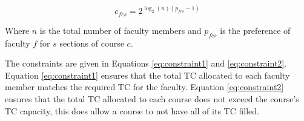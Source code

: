 \documentclass{article}
\begin{document}
    \begin{equation}
        c_{fcs} = 2^{\log_2(n)(p_{fcs}-1)} 
        \label{eq:cost}
    \end{equation}

    Where $n$ is the total number of faculty members and $p_{fcs}$ is the preference of faculty $f$ for $s$ sections of course $c$.

    The constraints are given in Equations \eqref{eq:constraint1} and \eqref{eq:constraint2}. 
    Equation \eqref{eq:constraint1} ensures that the total TC allocated to each faculty member matches the required TC for the faculty.
    Equation \eqref{eq:constraint2} ensures that the total TC allocated to each course does not exceed the course's TC capacity, this does allow a course to not have all of its TC filled.
\end{document}
